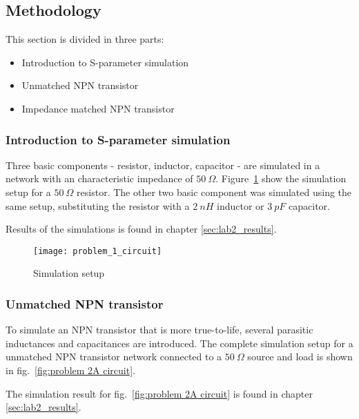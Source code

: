 \documentclass[report.tex]{subfiles}
\begin{document}
\subsection{Methodology}
\label{sec:lab2 methodology}
This section is divided in three parts:
\begin{itemize}
    \item Introduction to S-parameter simulation
    \item Unmatched NPN transistor
    \item Impedance matched NPN transistor
\end{itemize}
%
%

\subsubsection{Introduction to S-parameter simulation}
Three basic components - resistor, inductor, capacitor - are simulated in a network with an characteristic impedance of $50~\Omega$. Figure~\ref{fig:problem 1 circuit} show the simulation setup for a $50~\Omega$ resistor. The other two basic component was simulated using the same setup, substituting the resistor with a $2~nH$ inductor or $3~pF$ capacitor.

Results of the simulations is found in chapter \ref{sec:lab2_results}.

\begin{figure}[h]
    \centering
    \texttt{[image: problem\_1\_circuit]}
    \caption{Simulation setup}
    \label{fig:problem 1 circuit}
\end{figure}

\subsubsection{Unmatched NPN transistor}
To simulate an NPN transistor that is more true-to-life, several parasitic inductances and capacitances are introduced. The complete simulation setup for a unmatched NPN transistor network connected to a $50~\Omega$ source and load is shown in fig.~\ref{fig:problem 2A circuit}.

The simulation result for fig.~\ref{fig:problem 2A circuit} is found in chapter \ref{sec:lab2_results}.
\end{document}
